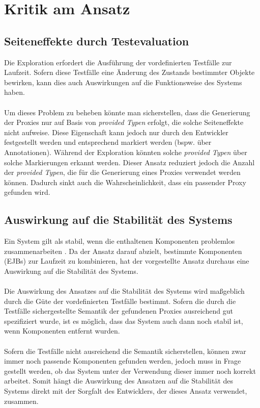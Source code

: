 \section{Kritik am Ansatz}

\subsection{Seiteneffekte durch Testevaluation}
Die Exploration erfordert die Ausführung der vordefinierten Testfälle zur Laufzeit. Sofern diese Testfälle eine Änderung des Zustands bestimmter Objekte bewirken, kann dies auch Auswirkungen auf die Funktionsweise des Systems haben. 
\\\\
Um dieses Problem zu beheben könnte man sicherstellen, dass die Generierung der Proxies nur auf Basis von \emph{provided Typen} erfolgt, die solche Seiteneffekte nicht aufweise. Diese Eigenschaft kann jedoch nur durch den Entwickler festgestellt werden und entsprechend markiert werden (bspw. über Annotationen). Während der Exploration könnten solche \emph{provided Typen} über solche Markierungen erkannt werden. Dieser Ansatz reduziert jedoch die Anzahl der \emph{provided Typen}, die für die Generierung eines Proxies verwendet werden können. Dadurch sinkt auch die Wahrscheinlichkeit, dass ein passender Proxy gefunden wird.
\subsection{Auswirkung auf die Stabilität des Systems}
Ein System gilt als stabil, wenn die enthaltenen Komponenten problemlos zusammenarbeiten \cite{}. Da der Ansatz darauf abzielt, bestimmte Komponenten (EJBs) zur Laufzeit zu kombinieren, hat der vorgestellte Ansatz durchaus eine Auswirkung auf die Stabilität des Systems.
\\\\
Die Auswirkung des Ansatzes auf die Stabilität des Systems wird maßgeblich durch die Güte der vordefinierten Testfälle bestimmt. Sofern die durch die Testfälle sichergestellte Semantik der gefundenen Proxies ausreichend gut spezifiziert wurde, ist es möglich, dass das System auch dann noch stabil ist, wenn Komponenten entfernt wurden.
\\\\
Sofern die Testfälle nicht ausreichend die Semantik sicherstellen, können zwar immer noch passende Komponenten gefunden werden, jedoch muss in Frage gestellt werden, ob das System unter der Verwendung dieser immer noch korrekt arbeitet. Somit hängt die Auswirkung des Ansatzen auf die Stabilität des Systems direkt mit der Sorgfalt des Entwicklers, der dieses Ansatz verwendet, zusammen.
